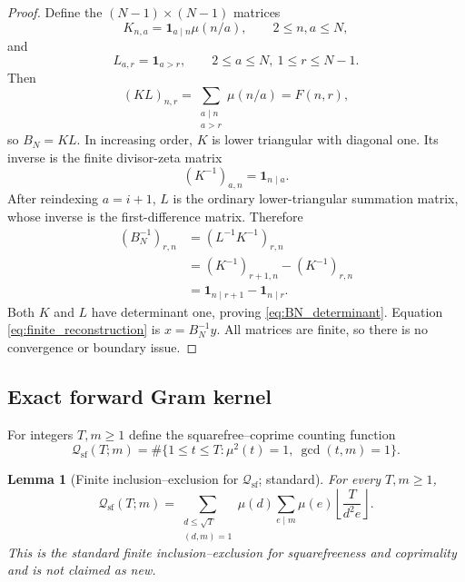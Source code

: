 \documentclass[11pt]{amsart}
\numberwithin{equation}{section}
\theoremstyle{plain}
\newtheorem{lemma}[theorem]{Lemma}
\theoremstyle{definition}
\theoremstyle{remark}
\newcommand{\one}{\mathbf 1}
\newcommand{\mob}{\mu}
\newcommand{\Fsurf}{F}
\begin{document}
\begin{proof}
Define the $(N-1)\times(N-1)$ matrices
\begin{equation}
K_{n,a}=\one_{a\mid n}\mob(n/a),
\qquad 2\le n,a\le N,
\label{eq:K_definition}
\end{equation}
and
\begin{equation}
L_{a,r}=\one_{a>r},
\qquad 2\le a\le N,\ 1\le r\le N-1.
\label{eq:L_definition}
\end{equation}
Then
\begin{equation}
(KL)_{n,r}=\sum_{\substack{a\mid n\\a>r}}\mob(n/a)=\Fsurf(n,r),
\label{eq:BN_factorization}
\end{equation}
so $B_N=KL$.  In increasing order, $K$ is lower triangular with diagonal one.  Its inverse is the finite divisor-zeta matrix
\begin{equation}
(K^{-1})_{a,n}=\one_{n\mid a}.
\label{eq:K_inverse}
\end{equation}
After reindexing $a=i+1$, $L$ is the ordinary lower-triangular summation matrix, whose inverse is the first-difference matrix.  Therefore
\begin{align}
(B_N^{-1})_{r,n}
&=(L^{-1}K^{-1})_{r,n}
\label{eq:BN_inverse_factorized}\\
&=(K^{-1})_{r+1,n}-(K^{-1})_{r,n}
\label{eq:BN_inverse_difference}\\
&=\one_{n\mid r+1}-\one_{n\mid r}.
\label{eq:BN_inverse_final}
\end{align}
Both $K$ and $L$ have determinant one, proving \eqref{eq:BN_determinant}.  Equation \eqref{eq:finite_reconstruction} is $x=B_N^{-1}y$.  All matrices are finite, so there is no convergence or boundary issue.
\end{proof}

\subsection{Exact forward Gram kernel}
\label{subsec:forward_gram_kernel}

For integers $T,m\ge1$ define the squarefree--coprime counting function
\begin{equation}
\mathcal Q_{\mathrm{sf}}(T;m)
=\#\{1\le t\le T:\mob^2(t)=1,\ \gcd(t,m)=1\}.
\label{eq:Qsf_definition}
\end{equation}

\begin{lemma}[Finite inclusion--exclusion for $\mathcal Q_{\mathrm{sf}}$; standard]
\label{lem:Qsf_inclusion_exclusion}
For every $T,m\ge1$,
\begin{equation}
\mathcal Q_{\mathrm{sf}}(T;m)
=\sum_{\substack{d\le\sqrt T\\(d,m)=1}}\mob(d)
\sum_{e\mid m}\mob(e)
\left\lfloor\frac{T}{d^2e}\right\rfloor.
\label{eq:Qsf_inclusion_exclusion}
\end{equation}
This is the standard finite inclusion--exclusion for squarefreeness and coprimality and is not claimed as new.
\end{lemma}
\end{document}
